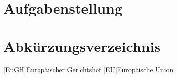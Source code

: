 \documentclass[12pt, a4paper, twoside]{article} %
\begin{document}
\section*{Aufgabenstellung}
\clearpage

\listoffigures
\clearpage

\listoftables
\clearpage

\section*{Abkürzungsverzeichnis}
\begin{acronym}[EuGH]
	[EuGH]{Europäischer Gerichtshof}
	[EU]{Europäische Union}
\end{acronym}
\clearpage

\pagestyle{fancy}



\newpage


\newpage


\newpage


\newpage


\newpage


\newpage


\newpage


\newpage


\newpage


\newpage


\newpage


\newpage


\newpage


\newpage

\end{document}

